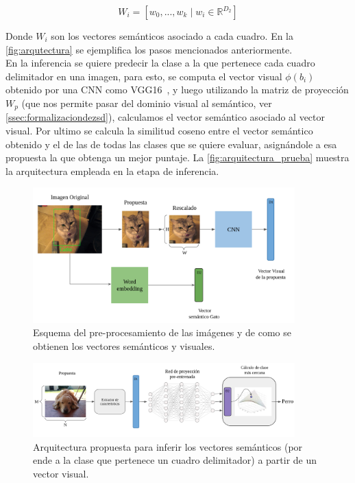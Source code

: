 \[W_i = [w_0,...,w_k \mid w_i \in \mathbb{R}^{D_2}]\]

Donde $W_i$ son los vectores semánticos asociado a cada cuadro. En la \autoref{fig:arqutectura} se ejemplifica los pasos mencionados anteriormente.\\


En la inferencia se quiere predecir la clase a la que pertenece cada cuadro delimitador en una imagen, para esto, se computa el vector visual $\phi(b_i)$ obtenido por una CNN como VGG16~\cite{simonyan2014very}, y luego utilizando la matriz de proyección $W_p$ (que nos permite pasar del dominio visual al semántico, ver \autoref{ssec:formalizaciondezsd}), calculamos el vector semántico asociado al vector visual. Por ultimo se calcula la similitud coseno entre el vector semántico obtenido y el de las de todas las clases que se quiere evaluar, asignándole a esa propuesta la que obtenga un mejor puntaje. La \autoref{fig:arquitectura_prueba} muestra la arquitectura empleada en la etapa de inferencia.

\begin{figure}[H]
	\centering
	\includegraphics[width=0.9\textwidth]{img/arquitectura.png}
	\caption{Esquema del pre-procesamiento de las imágenes y de como se obtienen los vectores semánticos y visuales.}
	\label{fig:arqutectura}
\end{figure}

\begin{figure}[H]
	\centering
	\includegraphics[width=0.9\textwidth]{img/arquitectura_prueba.png}
	\caption{Arquitectura propuesta para inferir los vectores semánticos (por ende a la clase que pertenece un cuadro delimitador) a partir de un vector visual.}
	\label{fig:arquitectura_prueba}
\end{figure}

